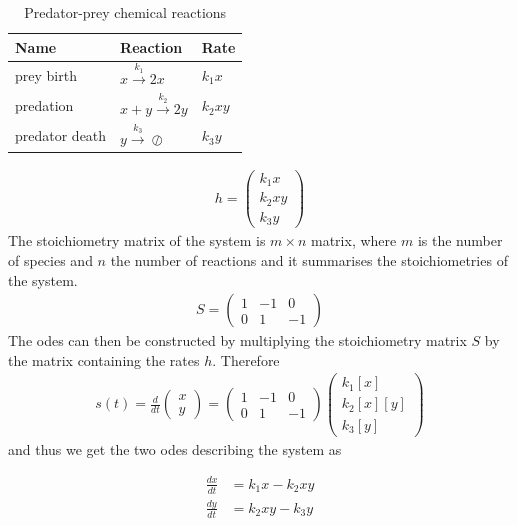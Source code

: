 \begin{table}[h]
\centering
\caption{Predator-prey chemical reactions}
\label{tab:pp_reac}
\begin{tabular}{@{}lll@{}}
\toprule
Name & Reaction & Rate \\ \midrule
prey birth & $x \xrightarrow{k_1} 2x$ & $k_{1}x$ \\
predation & $x + y \xrightarrow{k_2} 2y$ & $k_{2}xy$ \\
predator death & $y \xrightarrow{k_3} \oslash$ & $k_{3}y$ \\ \bottomrule
\end{tabular}
\end{table}

\begin{align*}
h = 
\begin{pmatrix}
	k_{1}x \\
	 k_{2}xy \\
	 k_{3}y 
\end{pmatrix}
\end{align*}
The stoichiometry matrix of the system is $m\times n$ matrix, where $m$ is the number of species and $n$ the number of reactions and it summarises the stoichiometries of the system.  
\begin{align}
S = \begin{pmatrix}
	1 & -1& 0\\
	0&1&-1 
\end{pmatrix}
\end{align}
The \acrshort{ode}s can then be constructed by multiplying the stoichiometry matrix $S$ by the matrix containing the rates $h$. Therefore
\begin{align}
s(t) = \frac{d}{dt}\begin{pmatrix}
x\\
y 
\end{pmatrix} = \begin{pmatrix}
1 &-1  &0 \\ 
 0&1  &-1 
\end{pmatrix}\begin{pmatrix}
k_1[x]\\
k_2[x][y]\\
k_3[y] 
\end{pmatrix}
\end{align}
and thus we get the two \acrshort{ode}s describing the system as

\begin{align}
\frac{dx}{dt} &= k_1x - k_2xy\\ \label{eq:predator-prey}
\frac{dy}{dt} &= k_2xy - k_3y
\end{align}

